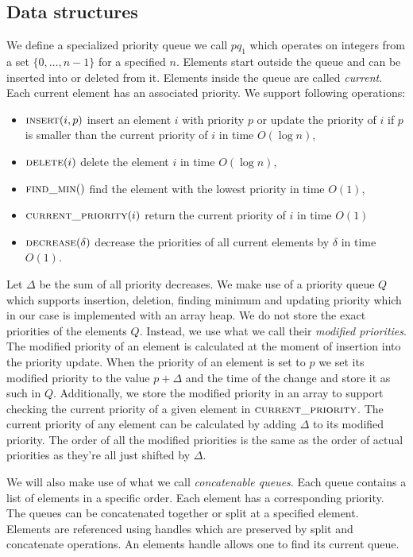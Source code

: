 \subsection{Data structures}

We define a specialized priority queue we call $pq_1$ which operates on integers from a set $\{0, \dots, n-1\}$ for a specified $n$. Elements start outside the queue and can be inserted into or deleted from it. Elements inside the queue are called \textit{current}. Each current element has an associated priority. We support following operations:

\begin{itemize}
    \item $\textsc{insert}(i, p)$ insert an element $i$ with priority $p$ or update the priority of $i$ if $p$ is smaller than the current priority of $i$ in time $O(\log n)$,
    \item $\textsc{delete}(i)$ delete the element $i$ in time $O(\log n)$,
    \item $\textsc{find\_min}()$ find the element with the lowest priority in time $O(1)$,
    \item $\textsc{current\_priority}(i)$ return the current priority of $i$ in time $O(1)$
    \item $\textsc{decrease}(\delta)$ decrease the priorities of all current elements by $\delta$ in time $O(1)$.
\end{itemize}

Let $\Delta$ be the sum of all priority decreases. We make use of a priority queue $Q$ which supports insertion, deletion, finding minimum and updating priority which in our case is implemented with an array heap. We do not store the exact priorities of the elements  $Q$. Instead, we use what we call their \textit{modified priorities}. The modified priority of an element is calculated at the moment of insertion into the priority update. When the priority of an element is set to $p$ we set its modified priority to the value $p + \Delta$ and the time of the change and store it as such in $Q$. Additionally, we store the modified priority in an array to support checking the current priority of a given element in $\textsc{current\_priority}$. The current priority of any element can be calculated by adding $\Delta$ to its modified priority. The order of all the modified priorities is the same as the order of actual priorities as they're all just shifted by $\Delta$.

We will also make use of what we call \textit{concatenable queues}. Each queue contains a list of elements in a specific order. Each element has a corresponding priority. The queues can be concatenated together or split at a specified element. Elements are referenced using handles which are preserved by split and concatenate operations. An elements handle allows one to find its current queue.

